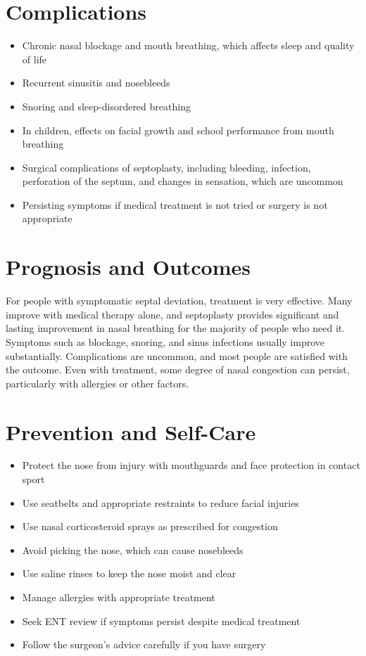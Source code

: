 \section*{Complications}
\begin{itemize}
    \item Chronic nasal blockage and mouth breathing, which affects sleep and quality of life
    \item Recurrent sinusitis and nosebleeds
    \item Snoring and sleep-disordered breathing
    \item In children, effects on facial growth and school performance from mouth breathing
    \item Surgical complications of septoplasty, including bleeding, infection, perforation of the septum, and changes in sensation, which are uncommon
    \item Persisting symptoms if medical treatment is not tried or surgery is not appropriate
\end{itemize}

\section*{Prognosis and Outcomes}
For people with symptomatic septal deviation, treatment is very effective. Many improve with medical therapy alone, and septoplasty provides significant and lasting improvement in nasal breathing for the majority of people who need it. Symptoms such as blockage, snoring, and sinus infections usually improve substantially. Complications are uncommon, and most people are satisfied with the outcome. Even with treatment, some degree of nasal congestion can persist, particularly with allergies or other factors.

\section*{Prevention and Self-Care}
\begin{itemize}
    \item Protect the nose from injury with mouthguards and face protection in contact sport
    \item Use seatbelts and appropriate restraints to reduce facial injuries
    \item Use nasal corticosteroid sprays as prescribed for congestion
    \item Avoid picking the nose, which can cause nosebleeds
    \item Use saline rinses to keep the nose moist and clear
    \item Manage allergies with appropriate treatment
    \item Seek ENT review if symptoms persist despite medical treatment
    \item Follow the surgeon's advice carefully if you have surgery
\end{itemize}

